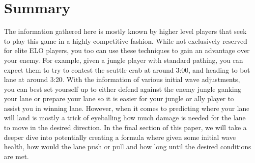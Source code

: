 \documentclass{article}
\begin{document}
\newpage
\section{Summary}
The information gathered here is mostly known by higher level players that seek to play this game in a highly competitive fashion. While not exclusively reserved for elite ELO players, you too can use these techniques to gain an advantage over your enemy. For example, given a jungle player with standard pathing, you can expect them to try to contest the scuttle crab at around 3:00, and heading to bot lane at around 3:20. With the information of various initial wave adjustments, you can best set yourself up to either defend against the enemy jungle ganking your lane or prepare your lane so it is easier for your jungle or ally player to assist you in winning lane. However, when it comes to predicting where your lane will land is mostly a trick of eyeballing how much damage is needed for the lane to move in the desired direction. In the final section of this paper, we will take a deeper dive into potentially creating a formula where given some initial wave health, how would the lane push or pull and how long until the desired conditions are met.


\end{document}
